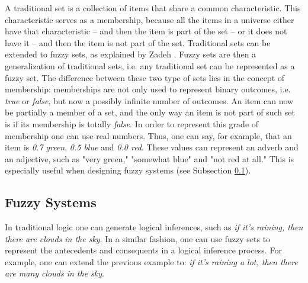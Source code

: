 A traditional set is a collection of items that share a common
characteristic. This characteristic serves as a membership, because all the
items in a universe either have that characteristic -- and then the item is part
of the set -- or it does not have it -- and then the item is not part of the
set. Traditional sets can be extended to fuzzy sets, as explained by Zadeh
\cite{Zadeh1965}. Fuzzy sets are then a generalization of traditional sets,
i.e. any traditional set can be represented as a fuzzy set. The difference
between these two type of sets lies in the concept of membership: memberships
are not only used to represent binary outcomes, i.e. \textit{true} or
\textit{false}, but now a possibly infinite number of outcomes. An item can now
be partially a member of a set, and the only way an item is not part of such set
is if its membership is totally \textit{false}. In order to represent this grade
of membership one can use real numbers. Thus, one can say, for example, that an
item is \textit{0.7 green}, \textit{0.5 blue} and \textit{0.0 red}. These values
can represent an adverb and an adjective, such as "very green," "somewhat blue"
and "not red at all." This is especially useful when designing fuzzy systems
(see Subsection \ref{subsection:fuzzy-systems}).


\subsection{Fuzzy Systems}
\label{subsection:fuzzy-systems}

In traditional logic one can generate logical inferences, such as \textit{if
  it's raining, then there are clouds in the sky}. In a similar fashion, one can
use fuzzy sets to represent the antecedents and consequents in a logical
inference process. For example, one can extend the previous example to:
\textit{if it's raining a lot, then there are many clouds in the sky}.


